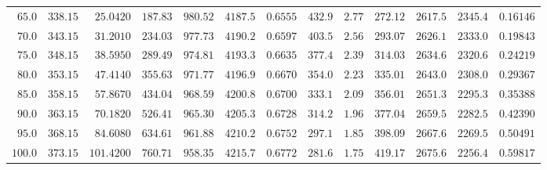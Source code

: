 {\begin{tabularx}{\linewidth}{@{}r r r r r r r r r r r r X@{}}
$65.0$ & $338.15$ & $25.0420$ & $187.83$ & $980.52$ & $4187.5$ & $0.6555$ & $432.9$ & $2.77$ & $272.12$ & $2617.5$ & $2345.4$ & $0.16146$\\
$70.0$ & $343.15$ & $31.2010$ & $234.03$ & $977.73$ & $4190.2$ & $0.6597$ & $403.5$ & $2.56$ & $293.07$ & $2626.1$ & $2333.0$ & $0.19843$\\
$75.0$ & $348.15$ & $38.5950$ & $289.49$ & $974.81$ & $4193.3$ & $0.6635$ & $377.4$ & $2.39$ & $314.03$ & $2634.6$ & $2320.6$ & $0.24219$\\
$80.0$ & $353.15$ & $47.4140$ & $355.63$ & $971.77$ & $4196.9$ & $0.6670$ & $354.0$ & $2.23$ & $335.01$ & $2643.0$ & $2308.0$ & $0.29367$\\
$85.0$ & $358.15$ & $57.8670$ & $434.04$ & $968.59$ & $4200.8$ & $0.6700$ & $333.1$ & $2.09$ & $356.01$ & $2651.3$ & $2295.3$ & $0.35388$\\
$90.0$ & $363.15$ & $70.1820$ & $526.41$ & $965.30$ & $4205.3$ & $0.6728$ & $314.2$ & $1.96$ & $377.04$ & $2659.5$ & $2282.5$ & $0.42390$\\
$95.0$ & $368.15$ & $84.6080$ & $634.61$ & $961.88$ & $4210.2$ & $0.6752$ & $297.1$ & $1.85$ & $398.09$ & $2667.6$ & $2269.5$ & $0.50491$\\
$100.0$ & $373.15$ & $101.4200$ & $760.71$ & $958.35$ & $4215.7$ & $0.6772$ & $281.6$ & $1.75$ & $419.17$ & $2675.6$ & $2256.4$ & $0.59817$\\
\bottomrule
\end{tabularx}}
\vspace{2pt}
